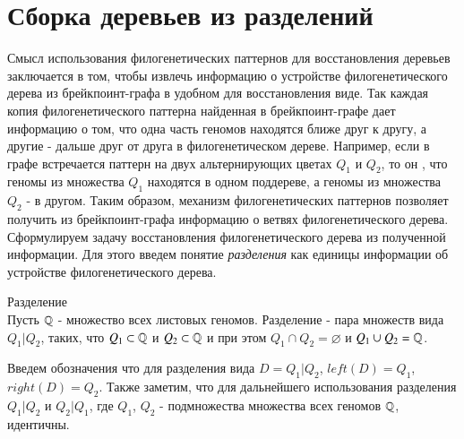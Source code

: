 \section{Сборка деревьев из разделений}
Смысл использования филогенетических паттернов для восстановления деревьев заключается в том,
чтобы извлечь информацию о устройстве филогенетического дерева из брейкпоинт-графа в удобном для восстановления виде.
Так каждая копия филогенетического паттерна найденная в брейкпоинт-графе дает информацию о том,
что одна часть геномов находятся ближе друг к другу, а другие - дальше друг от друга в филогенетическом дереве.
Например, если в графе встречается паттерн  на двух альтернирующих цветах $Q_1$ и $Q_2$, то он ,
что геномы из множества $Q_1$ находятся в одном поддереве, а геномы из множества $Q_2$ - в другом.
Таким образом, механизм филогенетических паттернов позволяет получить из брейкпоинт-графа информацию о ветвях филогенетического дерева.
Сформулируем задачу восстановления филогенетического дерева из полученной информации.
Для этого введем понятие \textit{разделения} как единицы информации об устройстве филогенетического дерева.
\begin{define}{Разделение} \\
  Пусть $\mathbb{Q}$ - множество всех листовых геномов.
  Разделение - пара множеств вида $Q_1|Q_2$, таких, что $Q_1 \subset \mathbb{Q}$ и $Q_2 \subset \mathbb{Q}$ и при этом
  $Q_1 \cap Q_2 = \varnothing$ и $Q_1 \cup Q_2 = \mathbb{Q}$.
\end{define}
Введем обозначения что для разделения вида $D = Q_1|Q_2$, $left(D) = Q_1$, $right(D) = Q_2$.
Также заметим, что для дальнейшего использования разделения $Q_1|Q_2$ и $Q_2|Q_1$,
где $Q_1$, $Q_2$ - подмножества множества всех геномов $\mathbb{Q}$, идентичны.

